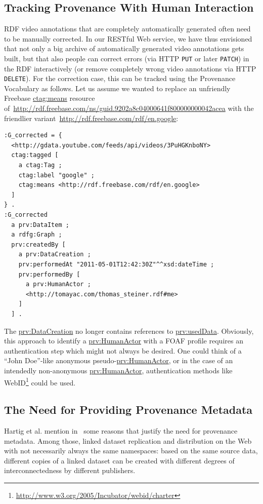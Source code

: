 \documentclass[conference]{IEEEtran}
\newcommand{\nofootnote}[1]{~#1}
\begin{document}
\subsection{Tracking Provenance With Human Interaction}                     \label{sec:human}
RDF video annotations that are completely automatically generated often need to be manually corrected. In our RESTful
Web service, we have thus envisioned that not only a big archive of automatically generated video annotations gets
built, but that also people can correct errors (via HTTP \texttt{PUT} or later \texttt{PATCH}) in the RDF interactively
(or remove completely wrong video annotations via HTTP \texttt{DELETE}). For the correction case, this can be tracked
using the Provenance Vocabulary as follows. Let us assume we wanted to replace an unfriendly Freebase \url{ctag:means}
resource of\nofootnote{\url{http://rdf.freebase.com/ns/guid.9202a8c04000641f800000000042acea}} with the friendlier
variant\nofootnote{\url{http://rdf.freebase.com/rdf/en.google}}:
\begin{lstlisting}
:G_corrected = {
  <http://gdata.youtube.com/feeds/api/videos/3PuHGKnboNY>
  ctag:tagged [
    a ctag:Tag ;
    ctag:label "google" ;
    ctag:means <http://rdf.freebase.com/rdf/en.google>
  ]
} .
:G_corrected
  a prv:DataItem ;
  a rdfg:Graph ;
  prv:createdBy [
    a prv:DataCreation ;
    prv:performedAt "2011-05-01T12:42:30Z"^^xsd:dateTime ;
    prv:performedBy [
      a prv:HumanActor ;
      <http://tomayac.com/thomas_steiner.rdf#me>
    ]
  ] .
\end{lstlisting}

The \url{prv:DataCreation} no longer contains references to \url{prv:usedData}. Obviously, this approach to identify a
\url{prv:HumanActor} with a FOAF profile requires an authentication step which might not always be desired. One could
think of a ``John Doe''-like anonymous pseudo-\url{prv:HumanActor}, or in the case of an intendedly non-anonymous
\url{prv:HumanActor}, authentication methods like WebID\footnote{\url{http://www.w3.org/2005/Incubator/webid/charter}}
could be used.

\subsection{The Need for Providing Provenance Metadata}
Hartig et al. mention in~\cite{ipaw10:olaf} some reasons that justify the need for provenance metadata. Among those,
linked dataset replication and distribution on the Web with not necessarily always the same namespaces: based on the
same source data, different copies of a linked dataset can be created with different degrees of interconnectedness by
different publishers.
\end{document}
